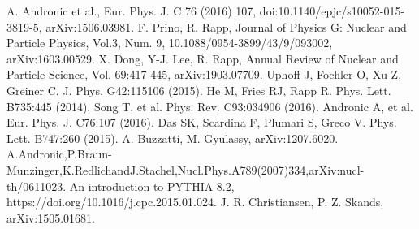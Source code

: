 \documentclass[3p,times,procedia]{elsarticle}
\begin{document}









 \begin{thebibliography}{00}


 A. Andronic et al., Eur. Phys. J. C 76 (2016) 107, doi:10.1140/epjc/s10052-015-3819-5, arXiv:1506.03981.
 F. Prino, R. Rapp, Journal of Physics G: Nuclear and Particle Physics, Vol.3, Num. 9, 10.1088/0954-3899/43/9/093002, arXiv:1603.00529.
 X. Dong, Y-J. Lee, R. Rapp, Annual Review of Nuclear and Particle Science, Vol. 69:417-445, arXiv:1903.07709.
 Uphoff J, Fochler O, Xu Z, Greiner C. J. Phys. G42:115106 (2015).
 He M, Fries RJ, Rapp R. Phys. Lett. B735:445 (2014).
 Song T, et al. Phys. Rev. C93:034906 (2016).
 Andronic A, et al. Eur. Phys. J. C76:107 (2016).
 Das SK, Scardina F, Plumari S, Greco V. Phys. Lett. B747:260 (2015).
 A. Buzzatti, M. Gyulassy, arXiv:1207.6020.
 A.Andronic,P.Braun-Munzinger,K.RedlichandJ.Stachel,Nucl.Phys.A789(2007)334,arXiv:nucl-th/0611023.
 An introduction to PYTHIA 8.2, https://doi.org/10.1016/j.cpc.2015.01.024.
 J. R. Christiansen, P. Z. Skands, arXiv:1505.01681.
\end{thebibliography}
\end{document}
